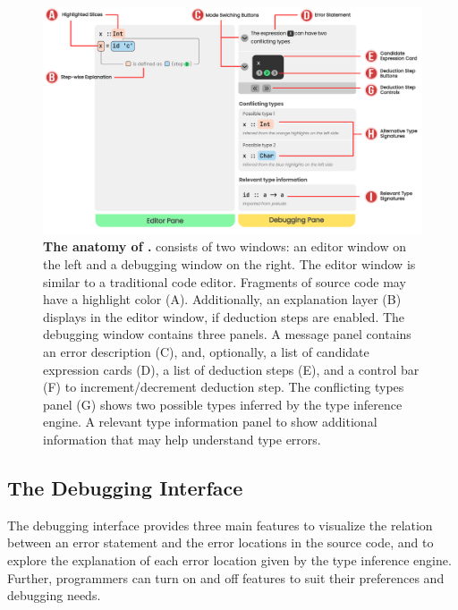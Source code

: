 \begin{figure}[h]
    \centering
    \includegraphics[width=\linewidth]{images/atonomy.pdf}
    \caption{
        \textbf{The anatomy of \chameleon{}.}
        \chameleon{} consists of two windows: an editor window on the left and a
        debugging window on the right. The editor window is similar to a
        traditional code editor. Fragments of source code may have a highlight
        color (A). Additionally, an explanation layer (B) displays in the editor
        window, if deduction steps are enabled. The debugging window contains
        three panels. A message panel contains an error description (C), and, optionally,
        a list of candidate expression cards (D), a list of deduction steps (E), 
        and a control bar (F) to increment/decrement deduction step. 
        The conflicting types
        panel (G) shows two possible types inferred by the type inference
        engine. A relevant type information panel to show additional information
        that may help understand type errors.
    }
    \label{fig:anatomy}
\end{figure}


\subsection{The Debugging Interface}

The \chameleon{} debugging interface provides three main features to visualize the relation between an error statement and the error locations in the source code, and to explore the explanation of each error location given by the type inference engine. Further, programmers  can turn on and off features to suit their preferences and debugging needs.



